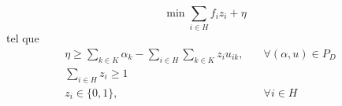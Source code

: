 \[ \min \sum_{i \in H} f_iz_i + \eta\]
tel que
\begin{subequations}
    \begin{align}
       \eta \ge \sum_{k \in K}\alpha_k - \sum_{i \in H}\sum_{k \in K} z_iu_{ik}, \quad &\forall{(\alpha,u) \in P_D}&\\
       \sum_{i \in H} z_i \ge 1 \quad &&\\
        z_i \in \{0,1\}, \quad & \forall{i \in H}&
    \end{align}
\end{subequations}
	


	
